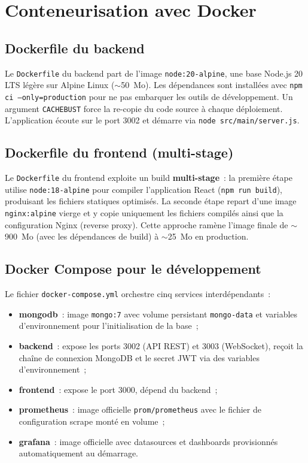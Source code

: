 \section{Conteneurisation avec Docker}

\subsection{Dockerfile du backend}

Le \texttt{Dockerfile} du backend part de l'image \texttt{node:20-alpine},
une base Node.js 20 LTS légère sur Alpine Linux ($\sim$50~Mo). Les
dépendances sont installées avec \texttt{npm ci --only=production} pour
ne pas embarquer les outils de développement. Un argument \texttt{CACHEBUST}
force la re-copie du code source à chaque déploiement. L'application
écoute sur le port 3002 et démarre via \texttt{node src/main/server.js}.

\subsection{Dockerfile du frontend (multi-stage)}

Le \texttt{Dockerfile} du frontend exploite un build \textbf{multi-stage}~:
la première étape utilise \texttt{node:18-alpine} pour compiler l'application
React (\texttt{npm run build}), produisant les fichiers statiques optimisés.
La seconde étape repart d'une image \texttt{nginx:alpine} vierge et y copie
uniquement les fichiers compilés ainsi que la configuration Nginx (reverse proxy).
Cette approche ramène l'image finale de $\sim$900~Mo (avec les dépendances de build)
à $\sim$25~Mo en production.


\subsection{Docker Compose pour le développement}

Le fichier \texttt{docker-compose.yml} orchestre cinq services interdépendants~:
\begin{itemize}
  \item \textbf{mongodb}~: image \texttt{mongo:7} avec volume persistant
        \texttt{mongo-data} et variables d'environnement pour l'initialisation
        de la base~;
  \item \textbf{backend}~: expose les ports 3002 (API REST) et 3003 (WebSocket),
        reçoit la chaîne de connexion MongoDB et le secret JWT via des variables
        d'environnement~;
  \item \textbf{frontend}~: expose le port 3000, dépend du backend~;
  \item \textbf{prometheus}~: image officielle \texttt{prom/prometheus} avec le
        fichier de configuration scrape monté en volume~;
  \item \textbf{grafana}~: image officielle avec datasources et dashboards
        provisionnés automatiquement au démarrage.
\end{itemize}

